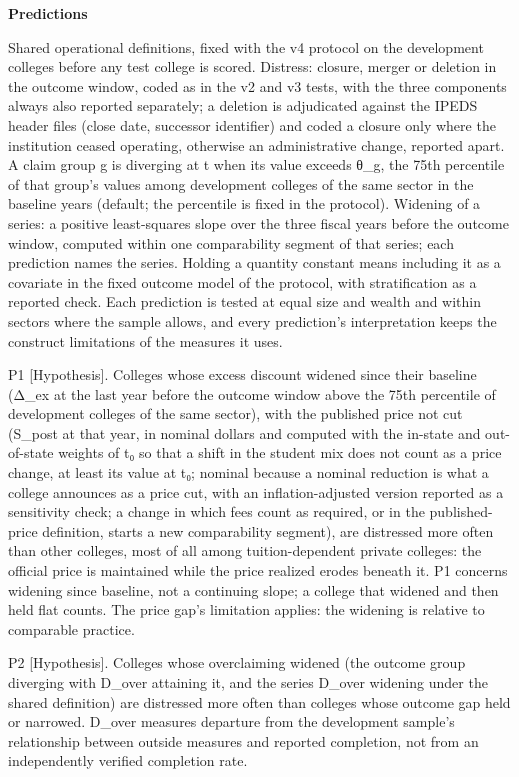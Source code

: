 \documentclass[
]{article}
\begin{document}
\textbf{Predictions}

Shared operational definitions, fixed with the v4 protocol on the
development colleges before any test college is scored. Distress:
closure, merger or deletion in the outcome window, coded as in the v2
and v3 tests, with the three components always also reported separately;
a deletion is adjudicated against the IPEDS header files (close date,
successor identifier) and coded a closure only where the institution
ceased operating, otherwise an administrative change, reported apart. A
claim group g is diverging at t when its value exceeds θ\_g, the 75th
percentile of that group's values among development colleges of the same
sector in the baseline years (default; the percentile is fixed in the
protocol). Widening of a series: a positive least-squares slope over the
three fiscal years before the outcome window, computed within one
comparability segment of that series; each prediction names the series.
Holding a quantity constant means including it as a covariate in the
fixed outcome model of the protocol, with stratification as a reported
check. Each prediction is tested at equal size and wealth and within
sectors where the sample allows, and every prediction's interpretation
keeps the construct limitations of the measures it uses.

P1 {[}Hypothesis{]}. Colleges whose excess discount widened since their
baseline (Δ\_ex at the last year before the outcome window above the
75th percentile of development colleges of the same sector), with the
published price not cut (S\_post at that year, in nominal dollars and
computed with the in-state and out-of-state weights of t₀ so that a
shift in the student mix does not count as a price change, at least its
value at t₀; nominal because a nominal reduction is what a college
announces as a price cut, with an inflation-adjusted version reported as
a sensitivity check; a change in which fees count as required, or in the
published-price definition, starts a new comparability segment), are
distressed more often than other colleges, most of all among
tuition-dependent private colleges: the official price is maintained
while the price realized erodes beneath it. P1 concerns widening since
baseline, not a continuing slope; a college that widened and then held
flat counts. The price gap's limitation applies: the widening is
relative to comparable practice.

P2 {[}Hypothesis{]}. Colleges whose overclaiming widened (the outcome
group diverging with D\_over attaining it, and the series D\_over
widening under the shared definition) are distressed more often than
colleges whose outcome gap held or narrowed. D\_over measures departure
from the development sample's relationship between outside measures and
reported completion, not from an independently verified completion rate.
\end{document}
